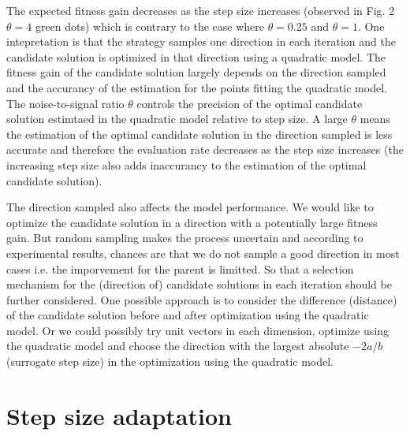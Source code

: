The expected fitness gain decreases as the step size increases (observed in Fig. 2 $\theta = 4$ green dots) which is contrary to the case where $\theta = 0.25$ and $\theta = 1$. One intepretation is that the strategy samples one direction in each iteration and the candidate solution is optimized in that direction using a quadratic model. The fitness gain of the candidate solution largely depends on the direction sampled and the accurancy of the estimation for the points fitting the quadratic model. The noise-to-signal ratio $\theta$ controls the precision of the optimal candidate solution estimtaed in the quadratic model relative to step size. A large $\theta$ means the estimation of the optimal candidate solution in the direction sampled is less accurate and therefore the evaluation rate decreases as the step size increases (the increasing step size also adds inaccurancy to the estimation of the optimal candidate solution).  

The direction sampled also affects the model performance. We would like to optimize the candidate solution in a direction with a potentially large fitness gain. But random sampling makes the process uncertain and according to experimental results, chances are that we do not sample a good direction in most cases i.e. the imporvement for the parent is limitted. So that a selection mechanism for the (direction of) candidate solutions in each iteration should be further considered. One possible approach is to consider the difference (distance) of the candidate solution before and after optimization using the quadratic model. Or we could possibly try unit vectors in each dimension, optimize using the quadratic model and choose the direction with the largest absolute $-2a/b$ (surrogate step size) in the optimization using the quadratic model.





\section{Step size adaptation}








